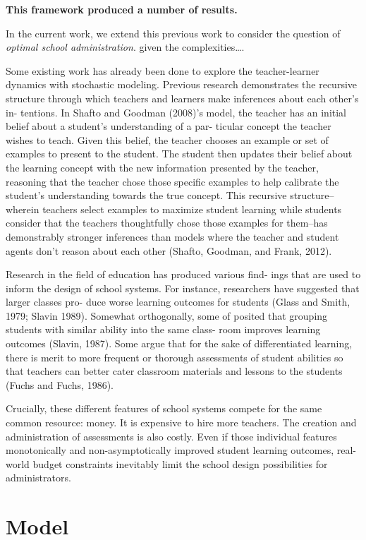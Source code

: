 \documentclass[10pt, letterpaper]{article}
\begin{document}
\textbf{This framework produced a number of results.}

In the current work, we extend this previous work to consider the
question of \emph{optimal school administration}. given the
complexities\ldots{}.

Some existing work has already been done to explore the teacher-learner
dynamics with stochastic modeling. Previous research demonstrates the
recursive structure through which teachers and learners make inferences
about each other's in- tentions. In Shafto and Goodman (2008)'s model,
the teacher has an initial belief about a student's understanding of a
par- ticular concept the teacher wishes to teach. Given this belief, the
teacher chooses an example or set of examples to present to the student.
The student then updates their belief about the learning concept with
the new information presented by the teacher, reasoning that the teacher
chose those specific examples to help calibrate the student's
understanding towards the true concept. This recursive
structure--wherein teachers select examples to maximize student learning
while students consider that the teachers thoughtfully chose those
examples for them--has demonstrably stronger inferences than models
where the teacher and student agents don't reason about each other
(Shafto, Goodman, and Frank, 2012).

Research in the field of education has produced various find- ings that
are used to inform the design of school systems. For instance,
researchers have suggested that larger classes pro- duce worse learning
outcomes for students (Glass and Smith, 1979; Slavin 1989). Somewhat
orthogonally, some of posited that grouping students with similar
ability into the same class- room improves learning outcomes (Slavin,
1987). Some argue that for the sake of differentiated learning, there is
merit to more frequent or thorough assessments of student abilities so
that teachers can better cater classroom materials and lessons to the
students (Fuchs and Fuchs, 1986).

Crucially, these different features of school systems compete for the
same common resource: money. It is expensive to hire more teachers. The
creation and administration of assessments is also costly. Even if those
individual features monotonically and non-asymptotically improved
student learning outcomes, real-world budget constraints inevitably
limit the school design possibilities for administrators.

\section{Model}\label{model}
\end{document}
